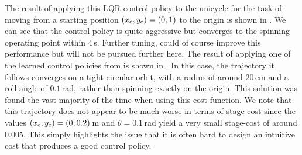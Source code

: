 The result of applying this LQR control policy to the unicycle for the task of moving from a starting position $(x_{\text{c}},y_{\text{c}}) = (0,1)$ to the origin is shown in . We can see that the control policy is quite aggressive but converges to the spinning operating point within 4\,s. Further tuning, could of course improve this performance but will not be pursued further here.
%
The result of applying one of the learned control policies from  is shown in . In this case, the trajectory it follows converges on a tight circular orbit, with a radius of around $20\,$cm and a roll angle of $0.1\,$rad, rather than spinning exactly on the origin. This solution was found the vast majority of the time when using this cost function. We note that this trajectory does not appear to be much worse in terms of stage-cost since the values $(x_{\text{c}}, y_{\text{c}}) = (0,0.2)\,$m and $\theta = 0.1\,$rad yield a very small stage-cost of around 0.005. This simply highlights the issue that it is often hard to design an intuitive cost that produces a good control policy. 




